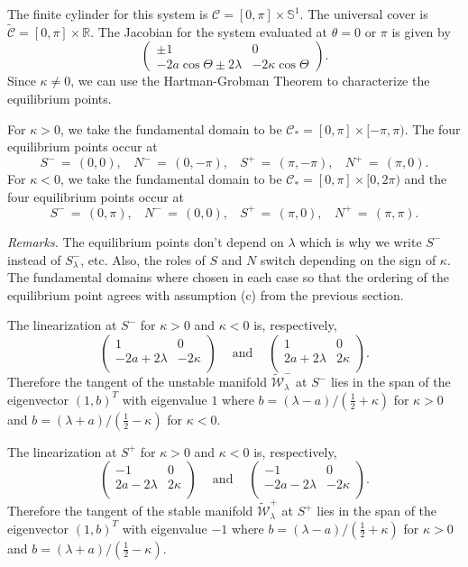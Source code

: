 \documentclass[11 pt]{article}
\renewcommand\l{\lambda}
\renewcommand\({\left(}
\renewcommand\){\right)}
\newcommand\wt{\widetilde}
\newcommand\<{\langle}
\renewcommand\>{\rangle}
\renewcommand\l{\lambda}
\newcommand\8{\infty}
\newcommand{\R}{\mathbb R}
\newcommand{\mc}{\mathcal}
\newcommand{\Sset}{\mathbb{S}}
\begin{document}
 
The finite cylinder for this system is $\mc{C} = [0, \pi] \times \Sset^1$. The universal cover is $\wt{\mc{C}} = [0, \pi] \times \R$. The Jacobian for the system evaluated at $\theta = 0$ or $\pi$ is given by
\[
\begin{pmatrix}
\pm 1 & 0
\\
-2a\cos \Theta \pm 2 \l & -2\kappa \cos \Theta
\end{pmatrix}.
\]
Since $\kappa \neq 0$, we can use the Hartman-Grobman Theorem to characterize the equilibrium points. 

For $\kappa > 0$, we take the fundamental domain to be $\mc{C}_* = [0,\pi] \times [-\pi, \pi)$. The four equilibrium points occur at 
\[
S^- \,=\, (0, 0), \:\:\:\: N^-  \,=\, (0,-\pi), \:\:\:\: S^+ \,=\, (\pi, -\pi), \:\:\:\: N^+ \,=\, (\pi, 0).
\]
For $\kappa < 0$, we take the fundamental domain to be $\mc{C}_* = [0,\pi] \times [0, 2\pi)$ and the four equilibrium points occur at
\[
S^- \,=\, (0, \pi), \:\:\:\: N^-  \,=\, (0,0), \:\:\:\: S^+ \,=\, (\pi, 0), \:\:\:\: N^+ \,=\, (\pi, \pi).
\]

\medskip
\noindent\emph{Remarks.} The equilibrium points don't depend on $\lambda$ which is why we write $S^-$ instead of $S^-_\lambda$, etc. Also, the roles of $S$ and $N$ switch depending on the sign of $\kappa$. The fundamental domains where chosen in each case so that the ordering of the equilibrium point agrees with assumption (c) from the previous section. 

\medskip
\medskip

The linearization at $S^-$ for $\kappa > 0$ and $\kappa < 0$ is, respectively,
\[
\begin{pmatrix}
1 & 0 \\
-2a + 2\l & -2\kappa \\
\end{pmatrix} \:\:\:\: \text{ and } \:\:\:\: \begin{pmatrix} 
1 & 0 \\
2a + 2\l & 2\kappa \\
\end{pmatrix}.
\]
Therefore the tangent of the unstable manifold $\wt{\mc{W}}^-_\lambda$ at $S^-$ lies in the span of the eigenvector $(1, b)^T$ with eigenvalue $1$ where $b = (\l - a)/(\frac{1}{2} + \kappa)$ for $\kappa > 0$ and $b = (\l + a)/(\frac{1}{2} - \kappa)$ for $\kappa < 0$. 

The linearization at $S^+$ for $\kappa > 0$ and $\kappa < 0$ is, respectively, 
\[
\begin{pmatrix}
-1 & 0 \\
2a - 2\l & 2\kappa \\
\end{pmatrix} \:\:\:\: \text{ and } \:\:\:\: \begin{pmatrix} 
-1 & 0 \\
-2a - 2\l & -2\kappa \\
\end{pmatrix}.
\]
Therefore the tangent of the stable manifold $\wt{\mc{W}}^+_\lambda$ at $S^+$ lies in the span of the eigenvector $(1,b)^T$ with eigenvalue $-1$ where $b = (\l - a)/(\frac{1}{2} + \kappa)$ for $\kappa > 0$ and $b = (\l + a)/(\frac{1}{2} - \kappa)$. 
\end{document}
